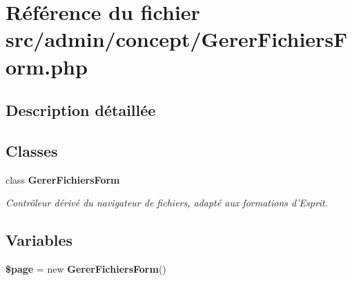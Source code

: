 \section{Référence du fichier src/admin/concept/GererFichiersForm.php}
\label{_gerer_fichiers_form_8php}


\subsection{Description détaillée}


\subsection*{Classes}
\begin{CompactItemize}
\item 
class {\bf GererFichiersForm}
\begin{CompactList}\small\item\em Contrôleur dérivé du navigateur de fichiers, adapté aux formations d'Esprit. \item\end{CompactList}\end{CompactItemize}
\subsection*{Variables}
\begin{CompactItemize}
\item 
\textbf{\$page} = new {\bf GererFichiersForm}()\label{_gerer_fichiers_form_8php_0a44e6760141442bb439b1ab1395d8ff}

\end{CompactItemize}
